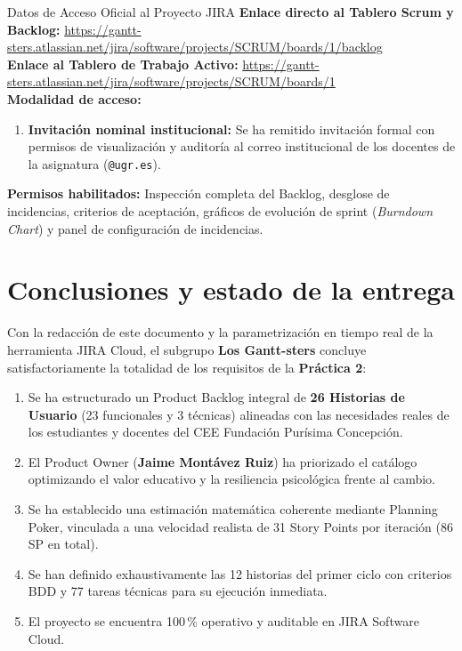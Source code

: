 \documentclass[11pt,a4paper]{article}
\newcommand{\hl}[1]{\textcolor{gblue}{\textbf{#1}}}
\begin{document}
\begin{verde}{Datos de Acceso Oficial al Proyecto JIRA}
\textbf{Enlace directo al Tablero Scrum y Backlog:} \url{https://gantt-sters.atlassian.net/jira/software/projects/SCRUM/boards/1/backlog}\\
\textbf{Enlace al Tablero de Trabajo Activo:} \url{https://gantt-sters.atlassian.net/jira/software/projects/SCRUM/boards/1}\\
\textbf{Modalidad de acceso:}
\begin{enumerate}[leftmargin=1.6em,itemsep=2pt]
\item \textbf{Invitación nominal institucional:} Se ha remitido invitación formal con permisos de visualización y auditoría al correo institucional de los docentes de la asignatura (\texttt{@ugr.es}).
\end{enumerate}
\textbf{Permisos habilitados:} Inspección completa del Backlog, desglose de incidencias, criterios de aceptación, gráficos de evolución de sprint (\textit{Burndown Chart}) y panel de configuración de incidencias.
\end{verde}

\section{Conclusiones y estado de la entrega}
Con la redacción de este documento y la parametrización en tiempo real de la herramienta JIRA Cloud, el subgrupo \hl{Los Gantt-sters} concluye satisfactoriamente la totalidad de los requisitos de la \textbf{Práctica 2}:

\begin{enumerate}[leftmargin=1.6em,itemsep=2pt]
\item Se ha estructurado un Product Backlog integral de \textbf{26 Historias de Usuario} (23 funcionales y 3 técnicas) alineadas con las necesidades reales de los estudiantes y docentes del CEE Fundación Purísima Concepción.
\item El Product Owner (\textbf{Jaime Montávez Ruiz}) ha priorizado el catálogo optimizando el valor educativo y la resiliencia psicológica frente al cambio.
\item Se ha establecido una estimación matemática coherente mediante Planning Poker, vinculada a una velocidad realista de 31 Story Points por iteración (86 SP en total).
\item Se han definido exhaustivamente las 12 historias del primer ciclo con criterios BDD y 77 tareas técnicas para su ejecución inmediata.
\item El proyecto se encuentra 100\,\% operativo y auditable en JIRA Software Cloud.
\end{enumerate}
\end{document}
